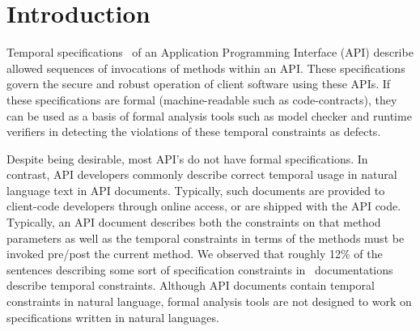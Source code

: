 \section{Introduction}
\label{sec:introduction}





Temporal specifications~\cite{slam-2002} of an Application Programming Interface (API) 
describe allowed sequences of invocations of methods within an API. 
These specifications govern the secure and robust operation of client software 
using these APIs.
If these specifications are formal (machine-readable such as code-contracts),
they can be used  as a basis of formal analysis tools such 
as model checker and runtime verifiers
in detecting the violations of these temporal constraints as defects.





Despite being desirable, most API's do not have formal specifications.
In contrast, API developers commonly describe correct temporal usage in natural language text in API documents.
Typically, such documents are provided to client-code developers through online access, or are shipped with the API code.
Typically, an API document describes both the constraints on that method parameters as well as the temporal constraints in terms of the methods must be invoked pre/post the current method.
We observed that roughly 12\% of the sentences describing some sort of specification constraints in \amazonAPI\ documentations describe temporal constraints.
Although API documents contain temporal constraints in natural language, formal analysis tools are not designed to work on specifications written in natural languages.

